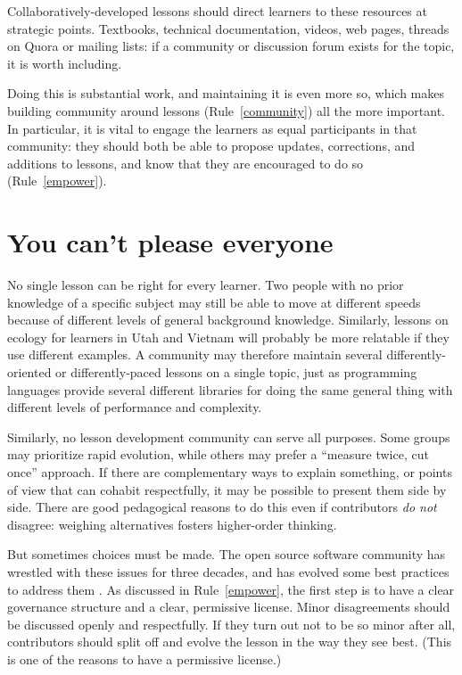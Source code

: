 \documentclass[10pt,letterpaper]{article}
\newcommand{\rulemajor}[2]{\section{#1}\label{#2}}
\newcommand{\ruleref}[1]{Rule~\ref{#1}}
\begin{document}
Collaboratively-developed lessons should direct learners to these resources at strategic points.
Textbooks,
technical documentation,
videos,
web pages,
threads on Quora or mailing lists:
if a community or discussion forum exists for the topic,
it is worth including.

Doing this is substantial work,
and maintaining it is even more so,
which makes building community around lessons (\ruleref{community}) all the more important.
In particular,
it is vital to engage the learners as equal participants in that community:
they should both be able to propose updates, corrections, and additions to lessons,
and know that they are encouraged to do so (\ruleref{empower}).

\rulemajor{You can't please everyone}{everyone}

No single lesson can be right for every learner.
Two people with no prior knowledge of a specific subject
may still be able to move at different speeds
because of different levels of general background knowledge.
Similarly,
lessons on ecology for learners in Utah and Vietnam
will probably be more relatable if they use different examples.
A community may therefore maintain several differently-oriented or differently-paced lessons
on a single topic,
just as programming languages provide several different libraries for doing the same general thing
with different levels of performance and complexity.

Similarly,
no lesson development community can serve all purposes.
Some groups may prioritize rapid evolution,
while others may prefer a ``measure twice, cut once'' approach.
If there are complementary ways to explain something,
or points of view that can cohabit respectfully,
it may be possible to present them side by side.
There are good pedagogical reasons to do this
even if contributors \emph{do not} disagree:
weighing alternatives fosters higher-order thinking.

But sometimes choices must be made.
The open source software community has wrestled with these issues for three decades,
and has evolved some best practices to address them
\cite{producing-oss}.
As discussed in \ruleref{empower},
the first step is to have a clear governance structure and a clear, permissive license.
Minor disagreements should be discussed openly and respectfully.
If they turn out not to be so minor after all,
contributors should split off and evolve the lesson in the way they see best.
(This is one of the reasons to have a permissive license.)
\end{document}
